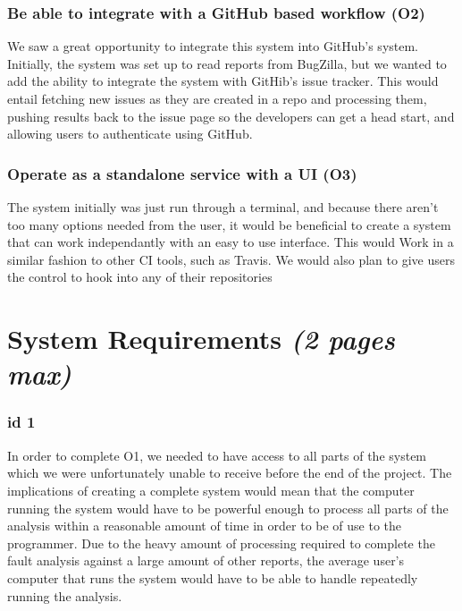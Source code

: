 \documentclass[12pt]{article}
\begin{document}
\hypertarget{be-able-to-integrate-with-a-github-based-workflow-o2}{%
\subsubsection{Be able to integrate with a GitHub based workflow
(O2)}\label{be-able-to-integrate-with-a-github-based-workflow-o2}}

We saw a great opportunity to integrate this system into GitHub's
system. Initially, the system was set up to read reports from BugZilla,
but we wanted to add the ability to integrate the system with GitHib's
issue tracker. This would entail fetching new issues as they are created
in a repo and processing them, pushing results back to the issue page so
the developers can get a head start, and allowing users to authenticate
using GitHub.

\hypertarget{operate-as-a-standalone-service-with-a-ui-o3}{%
\subsubsection{Operate as a standalone service with a UI
(O3)}\label{operate-as-a-standalone-service-with-a-ui-o3}}

The system initially was just run through a terminal, and because there
aren't too many options needed from the user, it would be beneficial to
create a system that can work independantly with an easy to use
interface. This would Work in a similar fashion to other CI tools, such
as Travis. We would also plan to give users the control to hook into any
of their repositories

\hypertarget{system-requirements-2-pages-max}{%
\section{\texorpdfstring{System Requirements \emph{(2 pages
max)}}{System Requirements (2 pages max)}}\label{system-requirements-2-pages-max}}

\hypertarget{id-1}{%
\subsubsection{id 1}\label{id-1}}

In order to complete O1, we needed to have access to all parts of the
system which we were unfortunately unable to receive before the end of
the project. The implications of creating a complete system would mean
that the computer running the system would have to be powerful enough to
process all parts of the analysis within a reasonable amount of time in
order to be of use to the programmer. Due to the heavy amount of
processing required to complete the fault analysis against a large
amount of other reports, the average user's computer that runs the
system would have to be able to handle repeatedly running the analysis.
\end{document}
